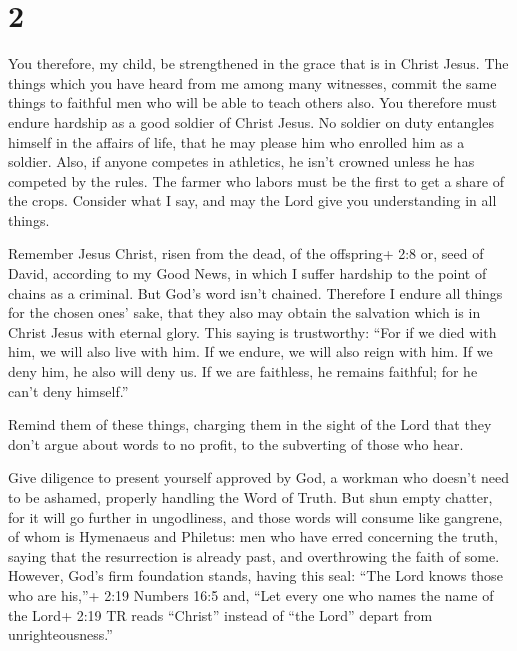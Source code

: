 \hypertarget{section-1}{%
\section{2}\label{section-1}}

 You therefore, my child, be strengthened in the grace that
is in Christ Jesus.  The things which you have heard from me
among many witnesses, commit the same things to faithful men who will be
able to teach others also.  You therefore must endure
hardship as a good soldier of Christ Jesus.  No soldier on
duty entangles himself in the affairs of life, that he may please him
who enrolled him as a soldier.  Also, if anyone competes in
athletics, he isn't crowned unless he has competed by the rules.
 The farmer who labors must be the first to get a share of
the crops.  Consider what I say, and may the Lord give you
understanding in all things.

 Remember Jesus Christ, risen from the dead, of the
offspring+ 2:8 or, seed of David, according to my Good News,
 in which I suffer hardship to the point of chains as a
criminal. But God's word isn't chained.  Therefore I endure
all things for the chosen ones' sake, that they also may obtain the
salvation which is in Christ Jesus with eternal glory. 
This saying is trustworthy: ``For if we died with him, we will also live
with him.  If we endure, we will also reign with him. If we
deny him, he also will deny us.  If we are faithless, he
remains faithful; for he can't deny himself.''

 Remind them of these things, charging them in the sight of
the Lord that they don't argue about words to no profit, to the
subverting of those who hear.

 Give diligence to present yourself approved by God, a
workman who doesn't need to be ashamed, properly handling the Word of
Truth.  But shun empty chatter, for it will go further in
ungodliness,  and those words will consume like gangrene,
of whom is Hymenaeus and Philetus:  men who have erred
concerning the truth, saying that the resurrection is already past, and
overthrowing the faith of some.  However, God's firm
foundation stands, having this seal: ``The Lord knows those who are
his,''+ 2:19 Numbers 16:5 and, ``Let every one who names the name of the
Lord+ 2:19 TR reads ``Christ'' instead of ``the Lord'' depart from
unrighteousness.''

